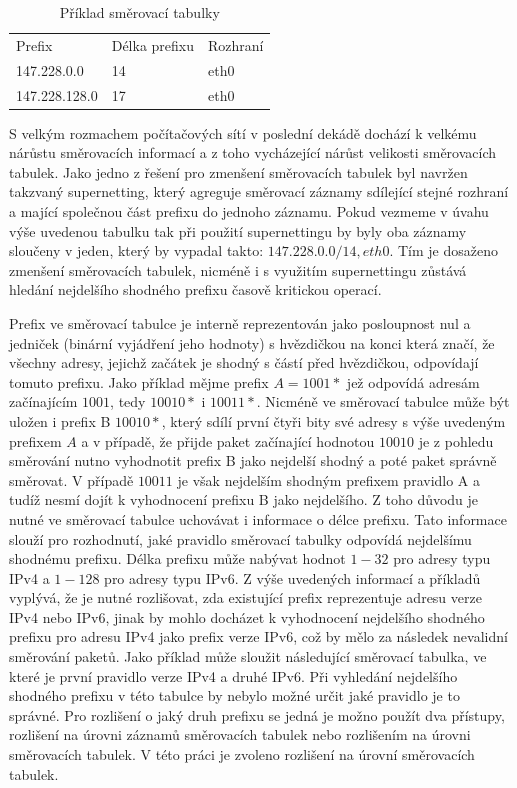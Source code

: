 \begin{table}[!htbp]
	\center
    \begin{tabular}{|l|l|l|}
    \hline
    Prefix        & Délka prefixu & Rozhraní \\ \hhline{|=|=|=|}
    147.228.0.0   & 14            & eth0       \\ \hline
    147.228.128.0 & 17            & eth0       \\ \hline
    \end{tabular}
    \caption{Příklad směrovací tabulky}
    \label{tab:routing-table}
\end{table}

S velkým rozmachem počítačových sítí v poslední dekádě dochází k velkému nárůstu směrovacích informací a z toho vycházející nárůst velikosti směrovacích tabulek. Jako jedno z řešení pro zmenšení směrovacích tabulek byl navržen takzvaný supernetting, který agreguje směrovací záznamy
sdílející stejné rozhraní a mající společnou část prefixu do jednoho záznamu.
Pokud vezmeme v úvahu výše uvedenou tabulku tak při použití supernettingu by byly oba záznamy sloučeny
v jeden, který by vypadal takto: $147.228.0.0/14, eth0$.
Tím je dosaženo zmenšení směrovacích tabulek, nicméně i s využitím supernettingu zůstává hledání nejdelšího shodného
prefixu časově kritickou operací.

Prefix ve směrovací tabulce je interně reprezentován jako posloupnost nul a jedniček (binární vyjádření jeho hodnoty) s hvězdičkou na konci která značí, že všechny adresy, jejichž začátek je shodný s částí před hvězdičkou, odpovídají tomuto prefixu.
Jako příklad mějme prefix $A = 1001*$ jež odpovídá adresám začínajícím $1001$, tedy $10010*$ i $10011*$.
Nicméně ve směrovací tabulce může být uložen i prefix B $10010*$, který sdílí první čtyři bity své adresy
s výše uvedeným prefixem $A$ a v případě, že přijde paket začínající hodnotou $10010$ je z pohledu směrování
nutno vyhodnotit prefix B jako nejdelší shodný a poté paket správně směrovat. V případě $10011$ je však nejdelším
shodným prefixem pravidlo A a tudíž nesmí dojít k vyhodnocení prefixu B jako nejdelšího.
Z toho důvodu je nutné ve směrovací tabulce uchovávat i informace o délce prefixu.
Tato informace slouží pro rozhodnutí, jaké pravidlo směrovací tabulky odpovídá nejdelšímu shodnému prefixu.
Délka prefixu může nabývat hodnot $1-32$ pro adresy typu
IPv4 a $1-128$ pro adresy typu IPv6.
Z výše uvedených informací a příkladů vyplývá,
že je nutné rozlišovat, zda existující prefix reprezentuje adresu verze IPv4 nebo IPv6,
jinak by mohlo docházet k vyhodnocení nejdelšího shodného prefixu pro adresu IPv4
jako prefix verze IPv6, což by mělo za následek nevalidní směrování paketů.
Jako příklad může sloužit následující směrovací tabulka, ve které je první pravidlo
verze IPv4 a druhé IPv6. Při vyhledání nejdelšího shodného prefixu v této tabulce by nebylo možné určit jaké pravidlo je to správné.
Pro rozlišení o jaký druh prefixu se jedná je možno použít dva přístupy, rozlišení na úrovni
záznamů směrovacích tabulek nebo rozlišením na úrovni směrovacích tabulek. V této práci je zvoleno rozlišení
na úrovní směrovacích tabulek.

